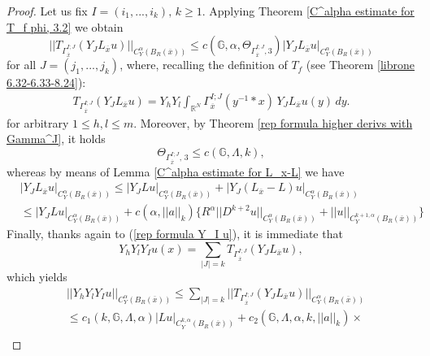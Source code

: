 \documentclass{article}
\numberwithin{equation}{section}
\begin{document}
\begin{proof}
    Let us fix $I=(i_1,...,i_k), \, k \geq 1$. Applying Theorem \ref{C^alpha estimate for T_f phi, 3.2} we obtain
    \begin{equation*}
        ||T_{\Gamma_{\overline{x}}^{I;J}}(Y_J L_{\overline{x}}u)||_{C^{\alpha}_Y(B_R(\overline{x}))} \leq c\left(\mathbb{G}, \alpha, \Theta_{\Gamma_{\overline{x}}^{I;J},3}\right) |Y_J L_{\overline{x}}u|_{C^{\alpha}_Y(B_R(\overline{x}))}
    \end{equation*}
    for all $J=(j_1,...,j_k)$, where, recalling the definition of $T_f$ (see Theorem \ref{librone 6.32-6.33-8.24}): 
    \begin{align*}
        T_{\Gamma_{\overline{x}}^{I;J}}(Y_J L_{\overline{x}}u) = Y_h Y_l \int_{\mathbb{R}^N} \Gamma_{\overline{x}}^{I;J}(y^{-1}*x) \, Y_J L_{\overline{x}}u(y) \, dy.
    \end{align*}
    for arbitrary $1 \leq h,l \leq m$. Moreover, by Theorem \ref{rep formula higher derivs with Gamma^J}, it holds
    \begin{equation*}
        \Theta_{\Gamma_{\overline{x}}^{I;J}, \, 3} \leq c(\mathbb{G}, \Lambda,k),
    \end{equation*}
    whereas by means of Lemma \ref{C^alpha estimate for L_x-L} we have
    \begin{align*}
        & |Y_J L_{\overline{x}}u|_{C^{\alpha}_Y(B_R(\overline{x}))} \leq |Y_J Lu|_{C^{\alpha}_Y(B_R(\overline{x}))} + |Y_J (L_{\overline{x}}-L)u|_{C^{\alpha}_Y(B_R(\overline{x}))} \\
        & \leq |Y_J Lu|_{C^{\alpha}_Y(B_R(\overline{x}))} + c(\alpha, ||a||_k) \{ R^{\alpha} ||D^{k+2} u||_{C^{\alpha}_Y(B_R(\overline{x}))}+ ||u||_{C^{k+1,\alpha}_Y(B_R(\overline{x}))} \}
    \end{align*}
    Finally, thanks again to (\ref{rep formula Y_I u}), it is immediate that
    \begin{equation*}
        Y_h Y_l Y_{I} u(x) = \sum_{|J|=k} T_{\Gamma_{\overline{x}}^{I;J}}(Y_J L_{\overline{x}}u),
    \end{equation*}
    which yields
    \begin{align*}
        & ||Y_h Y_l Y_{I} u||_{C^{\alpha}_Y(B_R(\overline{x}))} \leq \sum_{|J|=k} ||T_{\Gamma_{\overline{x}}^{I;J}}(Y_J L_{\overline{x}}u)||_{C^{\alpha}_Y(B_R(\overline{x}))} \\ 
        & \leq c_1(k,\mathbb{G}, \Lambda, \alpha)  |Lu|_{C^{k,\alpha}_Y(B_R(\overline{x}))} + c_2(\mathbb{G}, \Lambda, \alpha, k, ||a||_k) \times  \\

\end{align*}
\end{proof}
\end{document}
